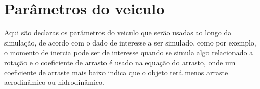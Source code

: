 \chapter{Parâmetros do veiculo}
Aqui são declaras os parâmetros do veiculo que serão usadas ao longo da simulação, de acordo com o dado de interesse a ser simulado, como por exemplo, o momento de inercia pode ser de interesse quando se simula algo relacionado a rotação e o coeficiente de arrasto é usado na equação do arrasto, onde um coeficiente de arraste mais baixo indica que o objeto terá menos arraste aerodinâmico ou hidrodinâmico.


%

%

%


%


